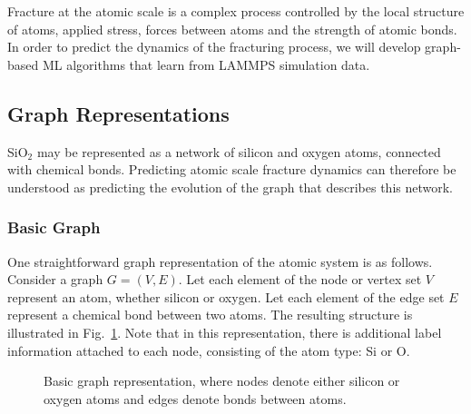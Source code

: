 Fracture at the atomic scale is a complex process controlled by the local structure of atoms, applied stress, forces between atoms and the strength of atomic bonds.  In order to predict the dynamics of the fracturing process, we will develop graph-based ML algorithms that learn from LAMMPS simulation data.


\subsection{Graph Representations}

SiO$_2$ may be represented as a network of silicon and oxygen atoms, connected with chemical bonds.  Predicting atomic scale fracture dynamics can therefore be understood as predicting the evolution of the graph that describes this network.

\subsubsection{Basic Graph}

One straightforward graph representation of the atomic system is as follows.  Consider a graph $G =(V,E)$.  Let each element of the node or vertex set $V$ represent an atom, whether silicon or oxygen.  Let each element of the edge set $E$ represent a chemical bond between two atoms.  The resulting structure is illustrated in Fig.~\ref{fig:basic_graph}.  Note that in this representation, there is additional label information attached to each node, consisting of the atom type: Si or O.

\begin{figure}
\centering
\noindent
\caption{Basic graph representation, where nodes denote either silicon or oxygen atoms and edges denote bonds between atoms.}
\label{fig:basic_graph}
\end{figure}

